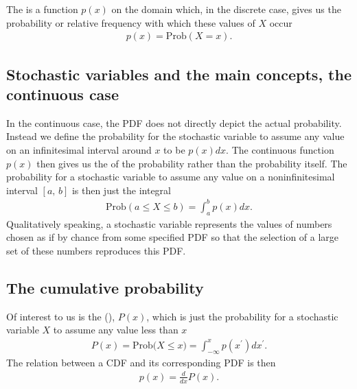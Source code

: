 \documentclass[letterpaper,10pt,english]{sphinxmanual}
\begin{document}
The  is a function
\(p(x)\) on the domain which, in the discrete case, gives us the
probability or relative frequency with which these values of \(X\)
occur
\begin{equation*}
\begin{split}
p(x) = \mathrm{Prob}(X=x).
\end{split}
\end{equation*}

\subsection{Stochastic variables and the main concepts, the continuous case}
\label{\detokenize{chapter3:stochastic-variables-and-the-main-concepts-the-continuous-case}}
In the continuous case, the PDF does not directly depict the
actual probability. Instead we define the probability for the
stochastic variable to assume any value on an infinitesimal interval
around \(x\) to be \(p(x)dx\). The continuous function \(p(x)\) then gives us
the  of the probability rather than the probability
itself. The probability for a stochastic variable to assume any value
on a non\sphinxhyphen{}infinitesimal interval \([a,\,b]\) is then just the integral
\begin{equation*}
\begin{split}
\mathrm{Prob}(a\leq X\leq b) = \int_a^b p(x)dx.
\end{split}
\end{equation*}
Qualitatively speaking, a stochastic variable represents the values of
numbers chosen as if by chance from some specified PDF so that the
selection of a large set of these numbers reproduces this PDF.


\subsection{The cumulative probability}
\label{\detokenize{chapter3:the-cumulative-probability}}
Of interest to us is the  (), \(P(x)\), which is just the probability
for a stochastic variable \(X\) to assume any value less than \(x\)
\begin{equation*}
\begin{split}
P(x)=\mathrm{Prob(}X\leq x\mathrm{)} =
\int_{-\infty}^x p(x^{\prime})dx^{\prime}.
\end{split}
\end{equation*}
The relation between a CDF and its corresponding PDF is then
\begin{equation*}
\begin{split}
p(x) = \frac{d}{dx}P(x).
\end{split}
\end{equation*}
\end{document}
